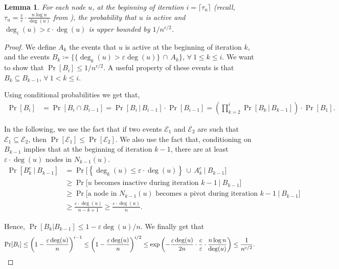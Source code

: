 \documentclass[10pt,a4paper]{article}
\newtheorem{lemma}{Lemma}[section]
\newcommand{\eps}{\ensuremath{\varepsilon}}
\begin{document}
 \begin{lemma} \label{lemma: low-deg-bound}
     For each node $u$, at the beginning of iteration $i = \lceil\tau_u\rceil$ (recall, $\tau_u = \frac{c}{\eps} \cdot \frac{n \log n}{\deg(u)}$ from ), the probability that $u$ is active and $\deg_{i}(u) > \eps \cdot \deg(u)$ is upper bounded by $1/n^{c/2}$.
 \end{lemma}
 \begin{proof}
We define $A_k$ the events that $u$ is active at the beginning of iteration $k$, and the events $B_k \coloneqq \{\{\deg_k(u)>\eps \deg(u)\} \, \cap \, A_k\}$, $\forall\ 1 \le k \le i$. 
We want to show that $\Pr[B_i]\leq 1/n^{c/2}$. A useful property of these events is that $B_k \subseteq B_{k-1}$, $\forall\ 1 < k \le i$.

Using conditional probabilities we get that,
\begin{align*}
    \Pr[B_i] &= \Pr[B_i \cap B_{i-1}] = \Pr[B_i\,|\, B_{i-1}]\cdot \Pr[B_{i-1}] = \left(\prod_{k=2}^i\Pr[B_k\,|\,B_{k-1}] \right)\cdot \Pr[B_1].
\end{align*}


In the following, we use the fact that if two events $\mathcal{E}_1$ and $\mathcal{E}_2$ are such that $\mathcal{E}_1\subseteq \mathcal{E}_2$, then $\Pr[\mathcal{E}_1]\leq \Pr[\mathcal{E}_2]$. 
We also use the fact that, conditioning on $B_{k-1}$ implies that at the beginning of iteration $k-1$, there are at least $\eps \cdot \deg(u)$ nodes in $N_{k-1}(u)$. 
\begin{align*}
    \Pr[B_k^c \ |\  B_{k-1}] &= \Pr\Big[\left\{\deg_k(u) \leq \eps\cdot \deg(u)\right\}\, \cup \, A_k^c \ | \ B_{k-1}\Big]\\
    & \geq \Pr\Big[\text{$u$ becomes inactive during iteration $k-1$} \  | \  B_{k-1}\Big]\\
    & \geq \Pr\Big[\text{a node in $N_{k-1}(u)$ becomes a pivot during iteration $k-1$} \  | \  B_{k-1}\Big]\\
    &\geq \frac{\eps\cdot \deg(u)}{n-k+1}\geq \frac{\eps\cdot \deg(u)}{n}.
\end{align*}



Hence, $\Pr[B_k|B_{k-1}]\leq 1-\eps\deg(u)/n$. 
We finally get that 
\begin{align*}
    \Pr[B_i] &\leq \left(1-\frac{\eps\deg(u)}{n}\right)^{i-1} \leq \left(1-\frac{\eps\deg(u)}{n}\right)^{i/2} 
    \leq \exp\left(-\frac{\eps\deg(u)}{2n}\cdot {\frac{c}{\eps}\cdot \frac{n\log n}{\deg(u)}} \right)\leq \frac{1}{n^{c/2}} . \qedhere
\end{align*}%
\end{proof}
\end{document}
